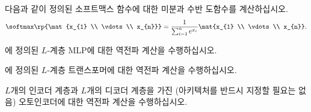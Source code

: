 \documentclass[../../book-main_ko.tex]{subfiles}
\begin{document}
\begin{exercise}
    다음과 같이 정의된 소프트맥스 함수에 대한 미분과 수반 도함수를 계산하십시오.
    \begin{equation}
        \softmax\rp{\mat{x_{1} \\ \vdots \\ x_{n}}} = \frac{1}{\sum_{i = 1}^{n}e^{x_{i}}}\mat{x_{1} \\ \vdots \\ x_{n}}.
    \end{equation}
\end{exercise}

\begin{exercise}
    에 정의된 \(L\)-계층 MLP에 대한 역전파 계산을 수행하십시오.
\end{exercise}

\begin{exercise}
    에 정의된 \(L\)-계층 트랜스포머에 대한 역전파 계산을 수행하십시오.
\end{exercise}

\begin{exercise}
    \(L\)개의 인코더 계층과 \(L\)개의 디코더 계층을 가진 (아키텍처를 반드시 지정할 필요는 없음) 오토인코더에 대한 역전파 계산을 수행하십시오.
\end{exercise}
\end{document}

